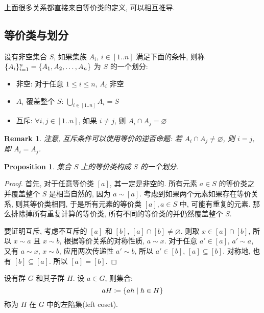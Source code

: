 \documentclass[UTF8]{ctexart}
\theoremstyle{mystyle}
\newtheorem{proposition}{Proposition}[section]
\theoremstyle{myremark}
\newtheorem*{remark}{Remark}
\theoremstyle{plain}
\DeclarePairedDelimiter\set{\{}{\}}
\begin{document}
上面很多关系都直接来自等价类的定义, 可以相互推导.

\subsection{等价类与划分}
\begin{definition}
    设有非空集合 $ S $, 如果集族 $ A_i $, $ i \in [1..n] $ 满足下面的条件, 则称 $ \set{A_i}_{i = 1}^n = \set{A_1, A_2, \dots, A_n} $ 为 $ S $ 的一个划分:
    \begin{itemize}
        \item 非空: 对于任意 $ 1 \leqslant i \leqslant n $, $ A_i $ 非空
        \item $ {A_i} $ 覆盖整个 $ S $: $ \displaystyle \bigcup_{i \in [1..n]} A_i = S $
        \item 互斥: $ \forall i, j \in [1..n] $, 如果 $ i \neq j $, 则 $ A_i \cap A_j = \varnothing $
    \end{itemize}
\end{definition}

\begin{remark}
    注意, 互斥条件可以使用等价的逆否命题: 若 $ A_i \cap A_j \neq \varnothing $, 则 $ i = j $, 即 $ A_i = A_j $.
\end{remark}

\begin{proposition}
    集合 $ S $ 上的等价类构成 $ S $ 的一个划分.
\end{proposition}

\begin{proof}
    首先, 对于任意等价类 $ [a] $, 其一定是非空的. 所有元素 $ a \in S $ 的等价类之并覆盖整个 $ S $ 是相当自然的, 因为 $ a \sim [a] $. 考虑到如果两个元素如果存在等价关系, 则其等价类相同, 于是所有元素的等价类 $ [a], a \in S $ 中, 可能有重复的元素. 那么排除掉所有重复计算的等价类, 所有不同的等价类的并仍然覆盖整个 $ S $.

    要证明互斥, 考虑不互斥的 $ [a] $ 和 $ [b] $, $ [a] \cap [b] \neq \varnothing $. 则取 $ x \in [a] \cap [b] $, 所以 $ x \sim a $ 且 $ x \sim b $, 根据等价关系的对称性质, $ a \sim x $. 对于任意 $ a' \in [a] $, $ a' \sim a $, 又有 $ a \sim x $, $ x \sim b $, 应用两次传递性 $ a' \sim b $, 所以 $ a' \in [b] $, $ [a] \subseteq [b] $. 对称地, 也有 $ [b] \subseteq [a] $. 所以 $ [a] = [b] $.
\end{proof}

\begin{definition}
    设有群 $ G $ 和其子群 $ H $. 设 $ a \in G $, 则集合:
    \[ a H \coloneqq \set{a h \mid h \in H} \]
    称为 $ H $ 在 $ G $ 中的左陪集(left coset).
\end{definition}
\end{document}
